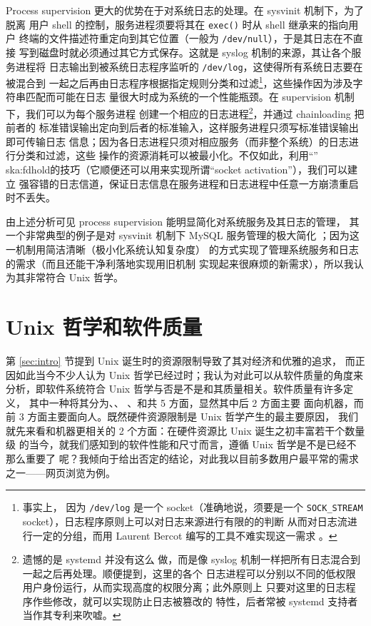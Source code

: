 Process supervision 更大的优势在于对系统日志的处理。在 sysvinit 机制下，为了脱离
用户 shell 的控制，服务进程须要将其在 \verb|exec()| 时从 shell 继承来的指向用户
终端的文件描述符重定向到其它位置（一般为 \verb|/dev/null|），于是其日志在不直接
写到磁盘时就必须通过其它方式保存。这就是 syslog 机制的来源，其让各个服务进程将
日志输出到被系统日志程序监听的 \verb|/dev/log|，这使得所有系统日志要在被混合到
一起之后再由日志程序根据指定规则分类和过滤\footnote{\label{fn:logtype}事实上，
因为 \texttt{/dev/log} 是一个 socket（准确地说，须要是一个 \texttt{SOCK\_STREAM}
socket），日志程序原则上可以对日志来源进行有限的的判断
从而对日志流进行一定的分组，而用 Laurent Bercot 编写的工具不难实现这一需求%
。}，这些操作因为涉及字符串匹配而可能在日志
量很大时成为系统的一个性能瓶颈。在 supervision 机制下，我们可以为每个服务进程
创建一个相应的日志进程\footnote{遗憾的是 systemd 并没有这么
做，而是像 syslog 机制一样把所有日志混合到一起之后再处理。顺便提到，这里的各个
日志进程可以分别以不同的低权限用户身份运行，从而实现高度的权限分离；此外原则上
只要对这里的日志程序作些修改，就可以实现防止日志被篡改的
特性，后者常被 systemd 支持者当作其专利来吹嘘。}，并通过 chainloading 把前者的
标准错误输出定向到后者的标准输入，这样服务进程只须写标准错误输出即可传输日志
信息；因为各日志进程只须对相应服务（而非整个系统）的日志进行分类和过滤，这些
操作的资源消耗可以被最小化。不仅如此，利用“”\cupercite%
{ska:fdhold}的技巧（它顺便还可以用来实现所谓“socket activation”），我们可以建立
强容错的日志信道，保证日志信息在服务进程和日志进程中任意一方崩溃重启时不丢失。

由上述分析可见 process supervision 能明显简化对系统服务及其日志的管理，
其一个非常典型的例子是对 sysvinit 机制下 MySQL 服务管理的极大简化%
；因为这一机制用简洁清晰（极小化系统认知复杂度）
的方式实现了管理系统服务和日志的需求（而且还能干净利落地实现用旧机制
实现起来很麻烦的新需求），所以我认为其非常符合 Unix 哲学。

\section{Unix 哲学和软件质量}\label{sec:quality}

第 \ref{sec:intro} 节提到 Unix 诞生时的资源限制导致了其对经济和优雅的追求，
而正因如此当今不少人认为 Unix 哲学已经过时；我认为对此可以从软件质量的角度来
分析，即软件系统符合 Unix 哲学与否是不是和其质量相关。软件质量有许多定义，
其中一种将其分为、、%
、和共 5 方面，显然其中后 2 方面主要
面向机器，而前 3 方面主要面向人。既然硬件资源限制是 Unix 哲学产生的最主要原因，
我们就先来看和机器更相关的 2 个方面：在硬件资源比 Unix 诞生之初丰富若干个数量级
的当今，就我们感知到的软件性能和尺寸而言，遵循 Unix 哲学是不是已经不那么重要了
呢？我倾向于给出否定的结论，对此我以目前多数用户最平常的需求之一——网页浏览为例。

